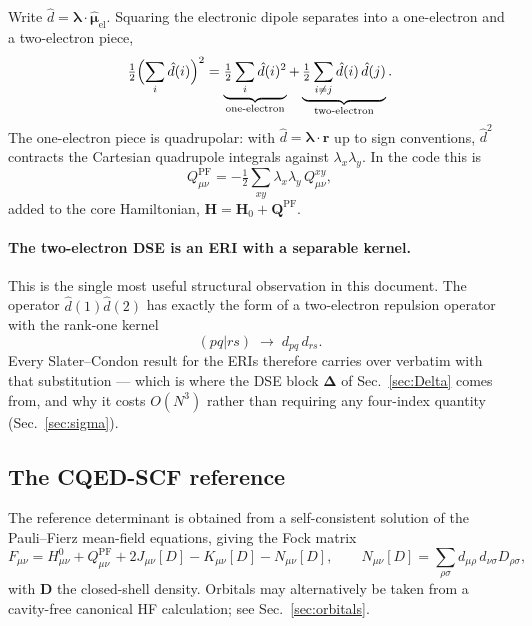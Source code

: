 \documentclass[11pt]{article}
\newcommand{\lam}{\bm{\lambda}}
\newcommand{\dop}{\hat{d}}                      %
\begin{document}
Write $\dop = \lam\cdot\hat{\bm{\mu}}_{\mathrm{el}}$. Squaring the electronic
dipole separates into a one-electron and a two-electron piece,
\begin{equation}
\tfrac{1}{2}\Bigl(\sum_i \dop(i)\Bigr)^{2}
= \underbrace{\tfrac{1}{2}\sum_i \dop(i)^2}_{\text{one-electron}}
+ \underbrace{\tfrac{1}{2}\sum_{i \ne j} \dop(i)\,\dop(j)}_{\text{two-electron}} .
\label{eq:dsesplit}
\end{equation}
The one-electron piece is quadrupolar: with $\dop = \lam\cdot\bm{r}$ up to sign
conventions, $\dop^2$ contracts the Cartesian quadrupole integrals against
$\lambda_x\lambda_y$. In the code this is
\begin{equation}
Q^{\mathrm{PF}}_{\mu\nu} =
-\tfrac{1}{2}\sum_{xy} \lambda_x \lambda_y \, Q^{xy}_{\mu\nu},
\label{eq:QPF}
\end{equation}
added to the core Hamiltonian, $\bm{H} = \bm{H}_0 + \bm{Q}^{\mathrm{PF}}$.

\paragraph{The two-electron DSE is an ERI with a separable kernel.}
This is the single most useful structural observation in this document. The
operator $\dop(1)\dop(2)$ has exactly the form of a two-electron repulsion
operator with the rank-one kernel
\begin{equation}
(pq|rs) \;\longrightarrow\; d_{pq}\, d_{rs} .
\label{eq:sepkernel}
\end{equation}
Every Slater--Condon result for the ERIs therefore carries over verbatim with
that substitution --- which is where the DSE block $\bm{\Delta}$ of
Sec.~\ref{sec:Delta} comes from, and why it costs $O(N^3)$ rather than
requiring any four-index quantity (Sec.~\ref{sec:sigma}).

\subsection{The CQED-SCF reference}

The reference determinant is obtained from a self-consistent solution of the
Pauli--Fierz mean-field equations, giving the Fock matrix
\begin{equation}
F_{\mu\nu} = H^0_{\mu\nu} + Q^{\mathrm{PF}}_{\mu\nu}
 + 2J_{\mu\nu}[D] - K_{\mu\nu}[D] - N_{\mu\nu}[D],
\qquad
N_{\mu\nu}[D] = \sum_{\rho\sigma} d_{\mu\rho}\, d_{\nu\sigma} D_{\rho\sigma},
\label{eq:fock}
\end{equation}
with $\bm{D}$ the closed-shell density. Orbitals may alternatively be taken from
a cavity-free canonical HF calculation; see Sec.~\ref{sec:orbitals}.
\end{document}

